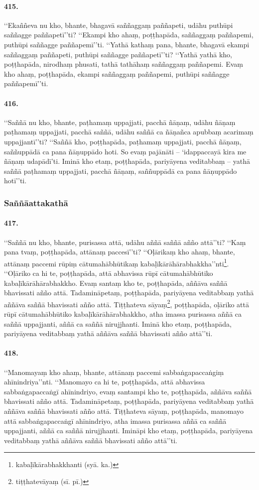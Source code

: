 \paragraph{415.} ‘‘Ekaññeva nu kho, bhante, bhagavā saññaggaṃ paññapeti, udāhu puthūpi saññagge paññapetī’’ti? ‘‘Ekampi kho ahaṃ, poṭṭhapāda, saññaggaṃ paññapemi, puthūpi saññagge paññapemī’’ti. ‘‘Yathā kathaṃ pana, bhante, bhagavā ekampi saññaggaṃ paññapeti, puthūpi saññagge paññapetī’’ti? ‘‘Yathā yathā kho, poṭṭhapāda, nirodhaṃ phusati, tathā tathāhaṃ saññaggaṃ paññapemi. Evaṃ kho ahaṃ, poṭṭhapāda, ekampi saññaggaṃ paññapemi, puthūpi saññagge paññapemī’’ti.

\paragraph{416.} ‘‘Saññā nu kho, bhante, paṭhamaṃ uppajjati, pacchā ñāṇaṃ, udāhu ñāṇaṃ paṭhamaṃ uppajjati, pacchā saññā, udāhu saññā ca ñāṇañca apubbaṃ acarimaṃ uppajjantī’’ti? ‘‘Saññā kho, poṭṭhapāda, paṭhamaṃ uppajjati, pacchā ñāṇaṃ, saññuppādā ca pana ñāṇuppādo hoti. So evaṃ pajānāti – ‘idappaccayā kira me ñāṇaṃ udapādī’ti. Iminā kho etaṃ, poṭṭhapāda, pariyāyena veditabbaṃ – yathā saññā paṭhamaṃ uppajjati, pacchā ñāṇaṃ, saññuppādā ca pana ñāṇuppādo hotī’’ti.

\subsubsection{Saññāattakathā}

\paragraph{417.} ‘‘Saññā nu kho, bhante, purisassa attā, udāhu aññā saññā añño attā’’ti? ‘‘Kaṃ pana tvaṃ, poṭṭhapāda, attānaṃ paccesī’’ti? ‘‘Oḷārikaṃ kho ahaṃ, bhante, attānaṃ paccemi rūpiṃ cātumahābhūtikaṃ kabaḷīkārāhārabhakkha’’nti\footnote{kabaḷīkārabhakkhanti (syā. ka.)}. ‘‘Oḷāriko ca hi te, poṭṭhapāda, attā abhavissa rūpī cātumahābhūtiko kabaḷīkārāhārabhakkho. Evaṃ santaṃ kho te, poṭṭhapāda, aññāva saññā bhavissati añño attā. Tadamināpetaṃ, poṭṭhapāda, pariyāyena veditabbaṃ yathā aññāva saññā bhavissati añño attā. Tiṭṭhateva sāyaṃ\footnote{tiṭṭhatevāyaṃ (sī. pī.)}, poṭṭhapāda, oḷāriko attā rūpī cātumahābhūtiko kabaḷīkārāhārabhakkho, atha imassa purisassa aññā ca saññā uppajjanti, aññā ca saññā nirujjhanti. Iminā kho etaṃ, poṭṭhapāda, pariyāyena veditabbaṃ yathā aññāva saññā bhavissati añño attā’’ti.

\paragraph{418.} ‘‘Manomayaṃ kho ahaṃ, bhante, attānaṃ paccemi sabbaṅgapaccaṅgiṃ ahīnindriya’’nti. ‘‘Manomayo ca hi te, poṭṭhapāda, attā abhavissa sabbaṅgapaccaṅgī ahīnindriyo, evaṃ santampi kho te, poṭṭhapāda, aññāva saññā bhavissati añño attā. Tadamināpetaṃ, poṭṭhapāda, pariyāyena veditabbaṃ yathā aññāva saññā bhavissati añño attā. Tiṭṭhateva sāyaṃ, poṭṭhapāda, manomayo attā sabbaṅgapaccaṅgī ahīnindriyo, atha imassa purisassa aññā ca saññā uppajjanti, aññā ca saññā nirujjhanti. Imināpi kho etaṃ, poṭṭhapāda, pariyāyena veditabbaṃ yathā aññāva saññā bhavissati añño attā’’ti.

